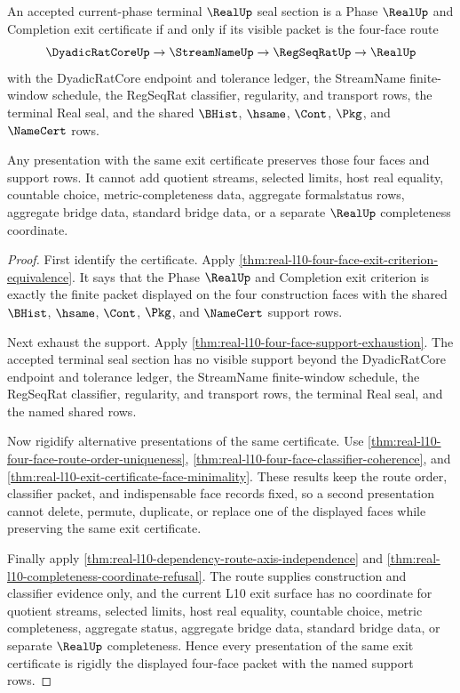 \begin{theorem}
\label{thm:real-l10-four-face-exit-certificate-rigidification}
An accepted current-phase terminal $\RealUp$ seal section is a Phase $\RealUp$ and Completion exit certificate if and only if its visible packet is the four-face route
$$
\DyadicRatCoreUp \to \StreamNameUp \to \RegSeqRatUp \to \RealUp
$$
with the DyadicRatCore endpoint and tolerance ledger, the StreamName finite-window schedule, the RegSeqRat classifier, regularity, and transport rows, the terminal Real seal, and the shared $\BHist$, $\hsame$, $\Cont$, $\Pkg$, and $\NameCert$ rows.

Any presentation with the same exit certificate preserves those four faces and support rows. It cannot add quotient streams, selected limits, host real equality, countable choice, metric-completeness data, aggregate formalstatus rows, aggregate bridge data, standard bridge data, or a separate $\RealUp$ completeness coordinate.
\end{theorem}
\begin{proof}
First identify the certificate. Apply \autoref{thm:real-l10-four-face-exit-criterion-equivalence}. It says that the Phase $\RealUp$ and Completion exit criterion is exactly the finite packet displayed on the four construction faces with the shared $\BHist$, $\hsame$, $\Cont$, $\Pkg$, and $\NameCert$ support rows.

Next exhaust the support. Apply \autoref{thm:real-l10-four-face-support-exhaustion}. The accepted terminal seal section has no visible support beyond the DyadicRatCore endpoint and tolerance ledger, the StreamName finite-window schedule, the RegSeqRat classifier, regularity, and transport rows, the terminal Real seal, and the named shared rows.

Now rigidify alternative presentations of the same certificate. Use \autoref{thm:real-l10-four-face-route-order-uniqueness}, \autoref{thm:real-l10-four-face-classifier-coherence}, and \autoref{thm:real-l10-exit-certificate-face-minimality}. These results keep the route order, classifier packet, and indispensable face records fixed, so a second presentation cannot delete, permute, duplicate, or replace one of the displayed faces while preserving the same exit certificate.

Finally apply \autoref{thm:real-l10-dependency-route-axis-independence} and \autoref{thm:real-l10-completeness-coordinate-refusal}. The route supplies construction and classifier evidence only, and the current L10 exit surface has no coordinate for quotient streams, selected limits, host real equality, countable choice, metric completeness, aggregate status, aggregate bridge data, standard bridge data, or separate $\RealUp$ completeness. Hence every presentation of the same exit certificate is rigidly the displayed four-face packet with the named support rows.
\end{proof}

